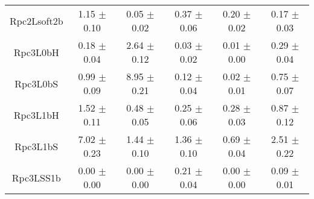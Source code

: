 \begin{table}[!htb]
{\begin{tabular}{|c|c|c|c|c|c|}
 Rpc2Lsoft2b  &     1.15 $\pm$ 0.10   &     0.05 $\pm$ 0.02  &     0.37 $\pm$ 0.06  &     0.20 $\pm$ 0.02    &     0.17 $\pm$ 0.03  \\
 Rpc3L0bH  &     0.18 $\pm$ 0.04   &     2.64 $\pm$ 0.12  &     0.03 $\pm$ 0.02  &     0.01 $\pm$ 0.00    &     0.29 $\pm$ 0.04  \\
 Rpc3L0bS  &     0.99 $\pm$ 0.09   &     8.95 $\pm$ 0.21  &     0.12 $\pm$ 0.04  &     0.02 $\pm$ 0.01    &     0.75 $\pm$ 0.07  \\
 Rpc3L1bH  &     1.52 $\pm$ 0.11   &     0.48 $\pm$ 0.05  &     0.25 $\pm$ 0.06  &     0.28 $\pm$ 0.03    &     0.87 $\pm$ 0.12  \\
 Rpc3L1bS  &     7.02 $\pm$ 0.23   &     1.44 $\pm$ 0.10  &     1.36 $\pm$ 0.10  &     0.69 $\pm$ 0.04    &     2.51 $\pm$ 0.22  \\
 Rpc3LSS1b  &     0.00 $\pm$ 0.00   &     0.00 $\pm$ 0.00  &     0.21 $\pm$ 0.04  &     0.00 $\pm$ 0.00    &     0.09 $\pm$ 0.01  \\
\hline\hline
\end{tabular}}
\end{table}


\begin{table}[!htb]
\caption{Contributions of particular rare processes to the signal regions, relative to the summed contributions of all these processes.  
}
\label{tab:prompt_rare_contributions}
\def\arraystretch{1.1}
\centering
{}
\end{table}


